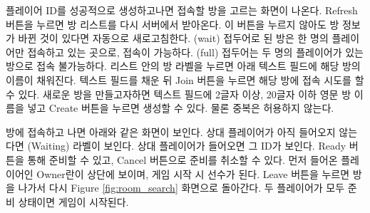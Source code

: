 \documentclass[a4paper, 10pt]{article}
\begin{document}
플레이어 ID를 성공적으로 생성하고나면 접속할 방을 고르는 화면이 나온다.
Refresh 버튼을 누르면 방 리스트를 다시 서버에서 받아온다. 이 버튼을 누르지
않아도 방 정보가 바뀐 것이 있다면 자동으로 새로고침한다. (wait) 접두어로
된 방은 한 명의 플레이어만 접속하고 있는 곳으로, 접속이 가능하다. (full)
접두어는 두 명의 플레이어가 있는 방으로 접속 불가능하다. 리스트 안의
방 라벨을 누르면 아래 텍스트 필드에 해당 방의 이름이 채워진다. 텍스트 필드를
채운 뒤 Join 버튼을 누르면 해당 방에 접속 시도를 할 수 있다. 새로운 방을
만들고자하면 텍스트 필드에 2글자 이상, 20글자 이하 영문 방 이름을 넣고
Create 버튼을 누르면 생성할 수 있다. 물론 중복은 허용하지 않는다.

방에 접속하고 나면 아래와 같은 화면이 보인다. 상대 플레이어가 아직 들어오지
않는다면 (Waiting) 라벨이 보인다. 상대 플레이어가 들어오면 그 ID가 보인다.
Ready 버튼을 통해 준비할 수 있고, Cancel 버튼으로 준비를 취소할 수 있다.
먼저 들어온 플레이어인 Owner란이 상단에 보이며, 게임 시작 시 선수가 된다.
Leave 버튼을 누르면 방을 나가서 다시 Figure \ref{fig:room_search} 화면으로
돌아간다. 두 플레이어가 모두 준비 상태이면 게임이 시작된다.
\end{document}

